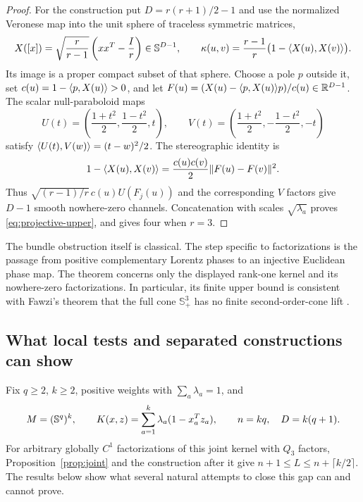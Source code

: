 \begin{proof}
For the construction put $D=r(r+1)/2-1$ and use the normalized Veronese
map into the unit sphere of traceless symmetric matrices,
\[
 X([x])=\sqrt{\frac r{r-1}}\left(xx^T-\frac Ir\right)
       \in\mathbb S^{D-1},\qquad
 \kappa(u,v)=\frac{r-1}{r}\bigl(1-\langle X(u),X(v)\rangle\bigr).
\]
Its image is a proper compact subset of that sphere. Choose a pole $p$
outside it, set $c(u)=1-\langle p,X(u)\rangle>0$, and let
$F(u)=(X(u)-\langle p,X(u)\rangle p)/c(u)\in\mathbb R^{D-1}$.
The scalar null-paraboloid maps
\begin{equation}\label{eq:scalar-chord-maps}
 U(t)=\left(\frac{1+t^2}2,\frac{1-t^2}2,t\right),\qquad
 V(t)=\left(\frac{1+t^2}2,-\frac{1-t^2}2,-t\right)
\end{equation}
satisfy $\langle U(t),V(w)\rangle=(t-w)^2/2$. The stereographic identity is
\[
 1-\langle X(u),X(v)\rangle
       =\frac{c(u)c(v)}2\lVert F(u)-F(v)\rVert^2.
\]
Thus $\sqrt{(r-1)/r}\,c(u)U(F_j(u))$ and the corresponding $V$ factors
give $D-1$ smooth nowhere-zero channels. Concatenation with scales
$\sqrt{\lambda_a}$ proves \eqref{eq:projective-upper}, and gives four
when $r=3$.
\end{proof}

The bundle obstruction itself is classical. The step specific to
factorizations is the passage from positive complementary Lorentz phases
to an injective Euclidean phase map. The theorem concerns only the
displayed rank-one kernel and its nowhere-zero factorizations. In
particular, its finite upper bound is consistent with Fawzi's theorem
that the full cone
$\mathbb S_+^3$ has no finite second-order-cone lift
\citep{Fawzi2019SOC}.

\subsection{What local tests and separated constructions can show}
Fix $q\geq2$, $k\geq2$, positive weights with $\sum_a\lambda_a=1$, and
\begin{equation}\label{eq:sphere-joint-kernel}
 M=(\mathbb S^q)^k,\qquad
 K(x,z)=\sum_{a=1}^k\lambda_a(1-x_a^Tz_a),\qquad
 n=kq,\quad D=k(q+1).
\end{equation}
For arbitrary globally $C^1$ factorizations of this joint kernel with
$Q_3$ factors, Proposition~\ref{prop:joint} and the construction after it
give $n+1\leq L\leq n+\lceil k/2\rceil$. The results below show what
several natural attempts to close this gap can and cannot prove.

